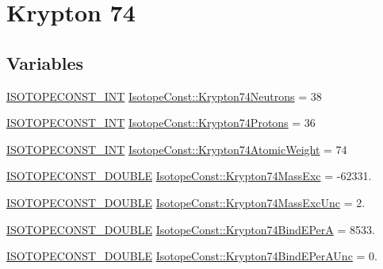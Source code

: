 \hypertarget{group___isotope_const-_krypton-_kr74}{}\section{Krypton 74}
\label{group___isotope_const-_krypton-_kr74}
\subsection*{Variables}
\begin{DoxyCompactItemize}
\item 
\mbox{\hyperlink{group___isotope_const-_macros_ga5f18360b3e99483a35c32d789e62621c}{I\+S\+O\+T\+O\+P\+E\+C\+O\+N\+S\+T\+\_\+\+I\+NT}} \mbox{\hyperlink{group___isotope_const-_krypton-_kr74_gaaad3ba259d481bf1ce9ebd6d54bb3ee3}{Isotope\+Const\+::\+Krypton74\+Neutrons}} = 38
\item 
\mbox{\hyperlink{group___isotope_const-_macros_ga5f18360b3e99483a35c32d789e62621c}{I\+S\+O\+T\+O\+P\+E\+C\+O\+N\+S\+T\+\_\+\+I\+NT}} \mbox{\hyperlink{group___isotope_const-_krypton-_kr74_gaf546cb7d65f9a356b0ee37cf83ecc402}{Isotope\+Const\+::\+Krypton74\+Protons}} = 36
\item 
\mbox{\hyperlink{group___isotope_const-_macros_ga5f18360b3e99483a35c32d789e62621c}{I\+S\+O\+T\+O\+P\+E\+C\+O\+N\+S\+T\+\_\+\+I\+NT}} \mbox{\hyperlink{group___isotope_const-_krypton-_kr74_ga8d924f93e7b4d407aa53627b4cce9c3c}{Isotope\+Const\+::\+Krypton74\+Atomic\+Weight}} = 74
\item 
\mbox{\hyperlink{group___isotope_const-_macros_ga8f45a7272ce02c0b4c65c44636ed719a}{I\+S\+O\+T\+O\+P\+E\+C\+O\+N\+S\+T\+\_\+\+D\+O\+U\+B\+LE}} \mbox{\hyperlink{group___isotope_const-_krypton-_kr74_ga1b5e556b1870d0dfa84bb89923f784f6}{Isotope\+Const\+::\+Krypton74\+Mass\+Exc}} = -\/62331.
\item 
\mbox{\hyperlink{group___isotope_const-_macros_ga8f45a7272ce02c0b4c65c44636ed719a}{I\+S\+O\+T\+O\+P\+E\+C\+O\+N\+S\+T\+\_\+\+D\+O\+U\+B\+LE}} \mbox{\hyperlink{group___isotope_const-_krypton-_kr74_gaf9aea4ebea6eb8c11ec6da2841625c19}{Isotope\+Const\+::\+Krypton74\+Mass\+Exc\+Unc}} = 2.
\item 
\mbox{\hyperlink{group___isotope_const-_macros_ga8f45a7272ce02c0b4c65c44636ed719a}{I\+S\+O\+T\+O\+P\+E\+C\+O\+N\+S\+T\+\_\+\+D\+O\+U\+B\+LE}} \mbox{\hyperlink{group___isotope_const-_krypton-_kr74_ga1ab0a68c0b6f8e5c511c8dd639300e70}{Isotope\+Const\+::\+Krypton74\+Bind\+E\+PerA}} = 8533.
\item 
\mbox{\hyperlink{group___isotope_const-_macros_ga8f45a7272ce02c0b4c65c44636ed719a}{I\+S\+O\+T\+O\+P\+E\+C\+O\+N\+S\+T\+\_\+\+D\+O\+U\+B\+LE}} \mbox{\hyperlink{group___isotope_const-_krypton-_kr74_ga02399ff73411650da286942c9851591d}{Isotope\+Const\+::\+Krypton74\+Bind\+E\+Per\+A\+Unc}} = 0.

\end{DoxyCompactItemize}
